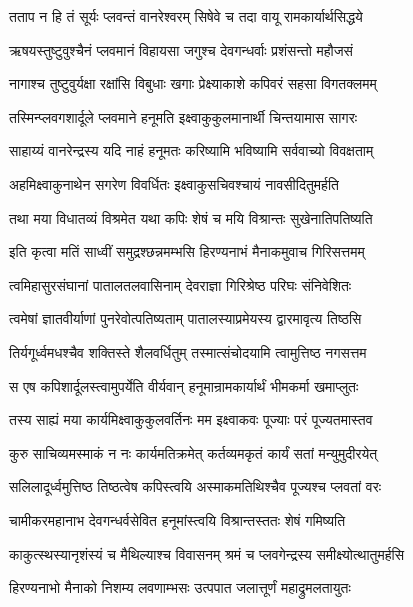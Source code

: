 \twolineshloka
{तताप न हि तं सूर्यः प्लवन्तं वानरेश्वरम्}
{सिषेवे च तदा वायू रामकार्यार्थसिद्धये} %

\twolineshloka
{ऋषयस्तुष्टुवुश्चैनं प्लवमानं विहायसा}
{जगुश्च देवगन्धर्वाः प्रशंसन्तो महौजसं} %

\twolineshloka
{नागाश्च तुष्टुवुर्यक्षा रक्षांसि विबुधाः खगाः}
{प्रेक्ष्याकाशे कपिवरं सहसा विगतक्लमम्} %

\twolineshloka
{तस्मिन्प्लवगशार्दूले प्लवमाने हनूमति}
{इक्ष्वाकुकुलमानार्थी चिन्तयामास सागरः} %

\twolineshloka
{साहाय्यं वानरेन्द्रस्य यदि नाहं हनूमतः}
{करिष्यामि भविष्यामि सर्ववाच्यो विवक्षताम्} %

\twolineshloka
{अहमिक्ष्वाकुनाथेन सगरेण विवर्धितः}
{इक्ष्वाकुसचिवश्चायं नावसीदितुमर्हति} %

\twolineshloka
{तथा मया विधातव्यं विश्रमेत यथा कपिः}
{शेषं च मयि विश्रान्तः सुखेनातिपतिष्यति} %

\twolineshloka
{इति कृत्वा मतिं साध्वीं समुद्रश्छन्नमम्भसि}
{हिरण्यनाभं मैनाकमुवाच गिरिसत्तमम्} %

\twolineshloka
{त्वमिहासुरसंघानां पातालतलवासिनाम्}
{देवराज्ञा गिरिश्रेष्ठ परिघः संनिवेशितः} %

\twolineshloka
{त्वमेषां ज्ञातवीर्याणां पुनरेवोत्पतिष्यताम्}
{पातालस्याप्रमेयस्य द्वारमावृत्य तिष्ठसि} %

\twolineshloka
{तिर्यगूर्ध्वमधश्चैव शक्तिस्ते शैलवर्धितुम्}
{तस्मात्संचोदयामि त्वामुत्तिष्ठ नगसत्तम} %

\twolineshloka
{स एष कपिशार्दूलस्त्वामुपर्येति वीर्यवान्}
{हनूमान्रामकार्यार्थं भीमकर्मा खमाप्लुतः} %

\twolineshloka
{तस्य साह्यं मया कार्यमिक्ष्वाकुकुलवर्तिनः}
{मम इक्ष्वाकवः पूज्याः परं पूज्यतमास्तव} %

\twolineshloka
{कुरु साचिव्यमस्माकं न नः कार्यमतिक्रमेत्}
{कर्तव्यमकृतं कार्यं सतां मन्युमुदीरयेत्} %

\twolineshloka
{सलिलादूर्ध्वमुत्तिष्ठ तिष्ठत्वेष कपिस्त्वयि}
{अस्माकमतिथिश्चैव पूज्यश्च प्लवतां वरः} %

\twolineshloka
{चामीकरमहानाभ देवगन्धर्वसेवित}
{हनूमांस्त्वयि विश्रान्तस्ततः शेषं गमिष्यति} %

\twolineshloka
{काकुत्स्थस्यानृशंस्यं च मैथिल्याश्च विवासनम्}
{श्रमं च प्लवगेन्द्रस्य समीक्ष्योत्थातुमर्हसि} %

\twolineshloka
{हिरण्यनाभो मैनाको निशम्य लवणाम्भसः}
{उत्पपात जलात्तूर्णं महाद्रुमलतायुतः} %

